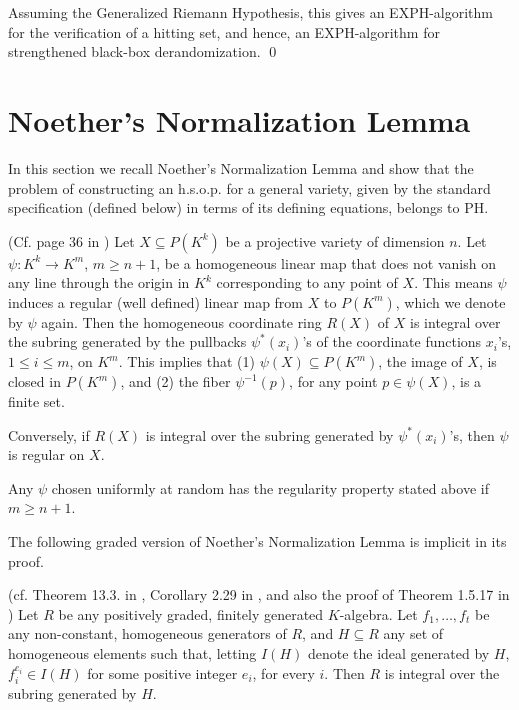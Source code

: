 \documentclass[11pt]{article}
\begin{document}
Assuming the Generalized Riemann Hypothesis, this gives an EXPH-algorithm for the verification of a hitting
set, and hence,  an EXPH-algorithm for strengthened black-box derandomization.
\qed 




%
\section{Noether's Normalization Lemma} \label{snoether}
In this section we recall Noether's Normalization Lemma
and show that the problem of constructing an h.s.o.p. for a general
variety, given by 
the standard specification (defined below)
in terms of its  defining equations, belongs to $\mbox{PH}$.


\begin{lemma}  (Cf. page 36 in \cite{mumfordalg}) \label{lnnl0}
Let $X \subseteq P(K^k)$ be  a  projective variety   of dimension $n$.
Let $\psi: K^k \rightarrow K^m$, $m \ge n+1$,  be a homogeneous 
linear map  that does not vanish on any line through the origin in $K^k$ corresponding to any point of  $X$. This means $\psi$ 
induces a regular (well defined) linear map from $X$ to $P(K^m)$, which we denote by $\psi$ again.
Then the homogeneous coordinate ring $R(X)$   of $X$ is integral over the subring generated by the pullbacks $\psi^*(x_i)$'s 
of the coordinate functions $x_i$'s, $1 \le i \le m$, on  $K^m$. This implies that 
(1) $\psi(X) \subseteq P(K^m)$, the image of $X$, is closed in $P(K^m)$, and (2)
the fiber $\psi^{-1}(p)$, for any point $p \in \psi(X)$, is a finite set. 

Conversely,  if 
$R(X)$  is integral over the subring generated by  $\psi^*(x_i)$'s, then $\psi$ is regular on $X$.
\end{lemma}

Any  $\psi$ chosen uniformly  at random has the regularity property stated above if $m \ge n+1$.

The following  graded version of Noether's Normalization Lemma  is implicit in its  proof.

\begin{lemma} \label{lnoether20}
(cf. Theorem 13.3. in \cite{eisenbudbook}, Corollary 2.29 in
 \cite{mumfordalg}, and also the proof of Theorem 1.5.17 in \cite{bruns})
Let $R$ be any positively graded, finitely generated  $K$-algebra. 
Let  $f_1,\ldots,f_t$ be any  non-constant, homogeneous generators of $R$, and
$H \subseteq R$ any set of homogeneous elements such that, letting $I(H)$ denote the ideal generated by $H$, 
$f_i^{e_i} \in I(H)$ for some positive integer $e_i$, for every $i$.
Then $R$ is integral over the   subring generated by $H$. 
\end{lemma}
\end{document}
